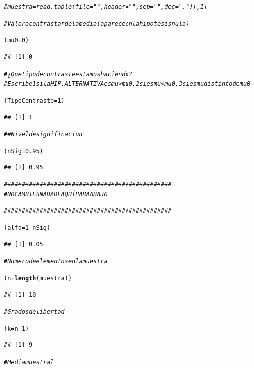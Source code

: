 \documentclass[10pt,a4paper]{article}\usepackage[]{graphicx}\usepackage[]{color}
\makeatletter
\newcommand{\hlnum}[1]{\textcolor[rgb]{0.686,0.059,0.569}{#1}}%
\newcommand{\hlcom}[1]{\textcolor[rgb]{0.678,0.584,0.686}{\textit{#1}}}%
\newcommand{\hlopt}[1]{\textcolor[rgb]{0,0,0}{#1}}%
\newcommand{\hlstd}[1]{\textcolor[rgb]{0.345,0.345,0.345}{#1}}%
\newcommand{\hlkwb}[1]{\textcolor[rgb]{0.69,0.353,0.396}{#1}}%
\newcommand{\hlkwd}[1]{\textcolor[rgb]{0.737,0.353,0.396}{\textbf{#1}}}%
\newenvironment{kframe}{%
 \def\at@end@of@kframe{}%
 \ifinner\ifhmode%
  \def\at@end@of@kframe{\end{minipage}}%
  \begin{minipage}{\columnwidth}%
 \fi\fi%
 \def\FrameCommand##1{\hskip\@totalleftmargin \hskip-\fboxsep
 \colorbox{shadecolor}{##1}\hskip-\fboxsep
     \hskip-\linewidth \hskip-\@totalleftmargin \hskip\columnwidth}%
 \MakeFramed {\advance\hsize-\width
   \@totalleftmargin\z@ \linewidth\hsize
   \@setminipage}}%
 {\par\unskip\endMakeFramed%
 \at@end@of@kframe}
\newenvironment{knitrout}{}{} %
\newcounter {cont01}
\makeatother
\begin{document}
\begin{knitrout}
\begin{kframe}
\begin{alltt}
\hlcom{#muestra = read.table(file="", header="", sep=" ",dec=".")[ , 1]}


\hlcom{# Valor a contrastar de la media (aparece en la hipotesis nula)}

\hlstd{(mu0} \hlkwb{=} \hlnum{0}\hlstd{)}
\end{alltt}
\begin{verbatim}
## [1] 0
\end{verbatim}
\begin{alltt}
\hlcom{# ¿Que tipo de contraste estamos haciendo?}
\hlcom{# Escribe 1 si la HIP. ALTERNATIVA es mu > mu0, 2 si es mu < mu0, 3 si es mu distinto de mu0}

\hlstd{(TipoContraste} \hlkwb{=} \hlnum{1}\hlstd{)}
\end{alltt}
\begin{verbatim}
## [1] 1
\end{verbatim}
\begin{alltt}
\hlcom{##Nivel de significacion}

\hlstd{(nSig} \hlkwb{=} \hlnum{0.95}\hlstd{)}
\end{alltt}
\begin{verbatim}
## [1] 0.95
\end{verbatim}
\begin{alltt}
\hlcom{###############################################}
\hlcom{# NO CAMBIES NADA DE AQUÍ PARA ABAJO}

\hlcom{###############################################}


\hlstd{(alfa} \hlkwb{=} \hlnum{1} \hlopt{-} \hlstd{nSig)}
\end{alltt}
\begin{verbatim}
## [1] 0.05
\end{verbatim}
\begin{alltt}
\hlcom{# Numero de elementos en la muestra}

\hlstd{(n} \hlkwb{=} \hlkwd{length}\hlstd{(muestra))}
\end{alltt}
\begin{verbatim}
## [1] 10
\end{verbatim}
\begin{alltt}
\hlcom{# Grados de libertad}

\hlstd{(k} \hlkwb{=} \hlstd{n} \hlopt{-} \hlnum{1}\hlstd{)}
\end{alltt}
\begin{verbatim}
## [1] 9
\end{verbatim}
\begin{alltt}
\hlcom{# Media muestral}


\end{alltt}
\end{kframe}
\end{knitrout}
\end{document}
